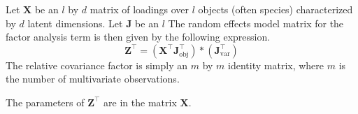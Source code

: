 \documentclass{article}\usepackage[]{graphicx}\usepackage[]{color}
\newcommand{\trans}{^\top}
\begin{document}
Let $\bm X$ be an $l$ by $d$ matrix of loadings over $l$ objects
(often species) characterized by $d$ latent dimensions. Let $\bm J$ be
an $l$ The random
effects model matrix for the factor analysis term is then given by the
following expression.
\begin{equation}
  \label{eq:1}
  \bm Z\trans = 
  \left(
    \bm X\trans \bm J\trans_{\text{obj}}
  \right) * 
  \left(
    \bm J\trans_{\text{var}}
  \right)
\end{equation}
The relative covariance factor is simply an $m$ by $m$ identity
matrix, where $m$ is the number of multivariate observations.

The parameters of $\bm Z\trans$ are in the matrix $\bm X$.  
\end{document}
